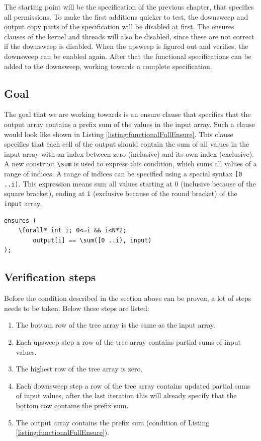 \documentclass[a4paper]{article}
\newcommand{\code}[1]{\texttt{\small \color{inline}#1}} %
\begin{document}
The starting point will be the specification of the previous chapter, that specifies all permissions. To make the first additions quicker to test, the downsweep and output copy parts of the specification will be disabled at first. The ensures clauses of the kernel and threads will also be disabled, since these are not correct if the downsweep is disabled. When the upsweep is figured out and verifies, the downsweep can be enabled again. After that the functional specifications can be added to the downsweep, working towards a complete specification.

\subsection{Goal}
The goal that we are working towards is an ensure clause that specifies that the output array contains a prefix sum of the values in the input array. Such a clause would look like shown in Listing \ref{listing:functionalFullEnsure}. This clause specifies that each cell of the output should contain the sum of all values in the input array with an index between zero (inclusive) and its own index (exclusive). A new construct \code{\textbackslash sum} is used to express this condition, which sums all values of a range of indices. A range of indices can be specified using a special syntax \code{[0 ..i)}. This expression means sum all values starting at 0 (inclusive because of the square bracket), ending at \code{i} (exclusive because of the round bracket) of the \code{input} array.

\begin{lstlisting}[caption=Ensure clause of the program that should be proven eventually, label=listing:functionalFullEnsure, float=htpb]
ensures (
	\forall* int i; 0<=i && i<N*2; 
		output[i] == \sum([0 ..i), input)
);
\end{lstlisting}

\subsection{Verification steps}
Before the condition described in the section above can be proven, a lot of steps needs to be taken. Below these steps are listed:
\begin{enumerate}
	\item The bottom row of the tree array is the same as the input array.
	\item Each upsweep step a row of the tree array contains partial sums of input values.
	\item The highest row of the tree array is zero.
	\item Each downsweep step a row of the tree array contains updated partial sums of input values, after the last iteration this will already specify that the bottom row contains the prefix sum.
	\item The output array contains the prefix sum (condition of Listing \ref{listing:functionalFullEnsure}).
\end{enumerate}
\end{document}
